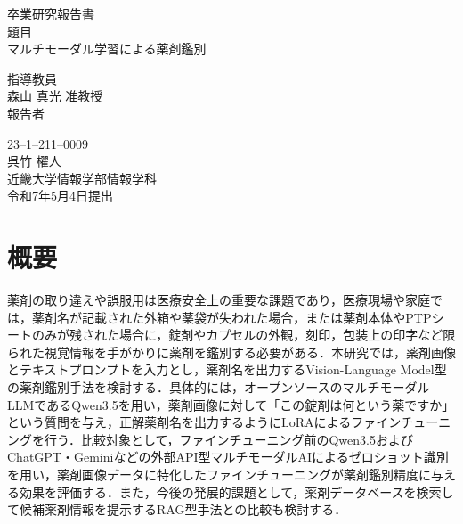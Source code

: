 \documentclass{ltjsarticle}
\begin{document}
\pagestyle{empty}

\begin{center}
\vspace*{1cm}
\large
{\LARGE 卒業研究報告書}\\
\vspace*{0.8cm}
題目\\
\vspace*{1cm}
{\Huge {マルチモーダル学習による薬剤鑑別}}\\
\vspace{3mm}

\vspace*{3cm}
指導教員\\
\vspace*{0.3cm}
{\LARGE 森山 真光  准教授}\\
\vspace*{3cm}
報告者\\
\vspace*{0.3cm}

{23--1--211--0009}\\
\vspace*{0.3cm}
{\Huge 呉竹 櫂人}\\
\vspace*{0.5cm}
近畿大学情報学部情報学科\\
\vspace*{2cm}
令和7年5月4日提出\\
\end{center}

\newpage
\normalsize

\clearpage
\section*{概要}

薬剤の取り違えや誤服用は医療安全上の重要な課題であり，医療現場や家庭では，薬剤名が記載された外箱や薬袋が失われた場合，または薬剤本体やPTPシートのみが残された場合に，錠剤やカプセルの外観，刻印，包装上の印字など限られた視覚情報を手がかりに薬剤を鑑別する必要がある．本研究では，薬剤画像とテキストプロンプトを入力とし，薬剤名を出力するVision-Language Model型の薬剤鑑別手法を検討する．具体的には，オープンソースのマルチモーダルLLMであるQwen3.5を用い，薬剤画像に対して「この錠剤は何という薬ですか」という質問を与え，正解薬剤名を出力するようにLoRAによるファインチューニングを行う．比較対象として，ファインチューニング前のQwen3.5およびChatGPT・Geminiなどの外部API型マルチモーダルAIによるゼロショット識別を用い，薬剤画像データに特化したファインチューニングが薬剤鑑別精度に与える効果を評価する．また，今後の発展的課題として，薬剤データベースを検索して候補薬剤情報を提示するRAG型手法との比較も検討する．
\end{document}
